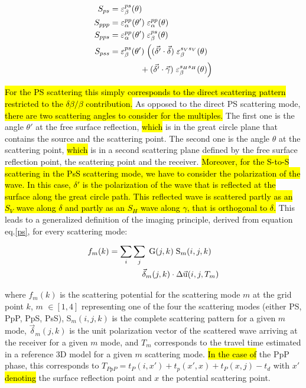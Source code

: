 \documentclass[10pt,a4paper]{article}
\begin{document}
\begin{align}
S_{ps}  &= \varepsilon^{ps}_{\beta}  (\theta)
\\
S_{ppp} &= \varepsilon^{pp}_{\alpha} (\theta') \; \varepsilon^{pp}_{\alpha} (\theta)
\\
S_{pps} &= \varepsilon^{pp}_{\alpha} (\theta') \; \varepsilon^{ps}_{\beta} (\theta)
\\
S_{pss} &= \varepsilon^{ps}_{\beta}  (\theta') \; \Big( (\vec{\delta'} \cdot \vec{\delta}) \; \varepsilon^{s_Vs_V}_{\beta} (\theta)
      \notag \\ & \qquad\qquad\!\! + (\vec{\delta'} \cdot \vec{\gamma}) \; \varepsilon^{s_Hs_H}_{\beta} (\theta) \Big)
\end{align}
\vspace{1mm}

\hl{For the PS scattering this simply corresponds to the direct scattering pattern restricted to the $\delta\beta/\beta$ contribution.}
As opposed to the direct PS scattering mode, \hl{there are two scattering angles to consider for the multiples.}
The first one is the angle $\theta'$ at the free surface reflection, \hl{which} is in the great circle plane that contains the source and the scattering point.
The second one is the angle $\theta$ at the scattering point, \hl{which} is in a second scattering plane defined by the free surface reflection point, the scattering point and the receiver.
\hl{Moreover, for the S-to-S scattering in the PsS scattering mode, we have to consider the polarization of the wave.
In this case, $\delta'$ is the polarization of the wave that is reflected at the surface along the great circle path.
This reflected wave is scattered partly as an $S_V$ wave along $\delta$ and partly as an $S_H$ wave along $\gamma$, that is orthogonal to $\delta$.}
This leads to a generalized definition of the imaging principle, derived from equation eq.\eqref{ps}, for every scattering mode:

\begin{align}
  f_{m}(k) &= \sum_i \sum_j \; \text{G}(j,k) \; \text{S}_{m}(i,j,k) \; \notag\\&\qquad\qquad \vec{\delta}_{m}(j,k) \cdot \Delta\vec{\text{u}}(i,j,T_m)
  \label{mod}
\end{align}
\vspace{1mm}

\noindent where $f_{m}(k)$ is the scattering potential for the scattering mode $m$ at the grid point $k$, 
$m$ $\in [1,4]$ representing one of the four the scattering modes (either PS, PpP, PpS, PsS), 
S$_m(i,j,k)$ is the complete scattering pattern for a given $m$ mode, 
$\vec{\delta}_m(j,k)$ is the unit polarization vector of the scattered wave arriving at the receiver for a given $m$ mode, 
and $T_m$ corresponds to the travel time estimated in a reference 3D model  for a given $m$ scattering mode.
\hl{In the case of} the PpP phase, this corresponds to $T_{PpP} = t_P(i,x') + t_p(x',x) + t_P(x,j) - t_d$ with $x'$ \hl{denoting} the surface reflection point and $x$ the potential scattering point.
\end{document}
